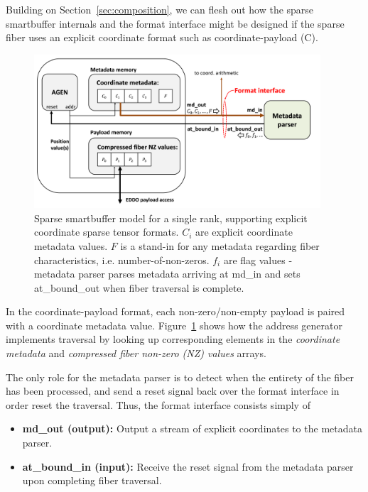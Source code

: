 Building on Section~\ref{sec:composition}, we can flesh out how the sparse smartbuffer internals and the format interface might be designed if the sparse fiber uses an explicit coordinate\cite{szebook} format such as coordinate-payload (C)\cite{szebook}.

\begin{figure}[ht]
    \centering
    \includegraphics[width=0.95\textwidth]{figures/single_rank_explicit_coordinate_smartbuffer_model.png}
    \caption{Sparse smartbuffer model for a single rank, supporting explicit coordinate sparse tensor formats. ${C_i}$ are explicit coordinate metadata values. $F$ is a stand-in for any metadata regarding fiber characteristics, i.e. number-of-non-zeros. ${f_i}$ are flag values - metadata parser parses metadata arriving at md\_in and sets at\_bound\_out when fiber traversal is complete.}
    \label{fig:single_rank_explicit_coordinate_smartbuffer_model}
\end{figure}

In the coordinate-payload format, each non-zero/non-empty payload is paired with a coordinate metadata value. Figure~\ref{fig:single_rank_explicit_coordinate_smartbuffer_model} shows how the address generator implements traversal by looking up corresponding elements in the \textit{coordinate metadata} and \textit{compressed fiber non-zero (NZ) values} arrays. 

The only role for the metadata parser is to detect when the entirety of the fiber has been processed, and send a reset signal back over the format interface in order reset the traversal. Thus, the format interface consists simply of

\begin{itemize}
    \item \textbf{md\_out (output):} Output a stream of explicit coordinates to the metadata parser.
    \item \textbf{at\_bound\_in (input):} Receive the reset signal from the metadata parser upon completing fiber traversal.
\end{itemize}

